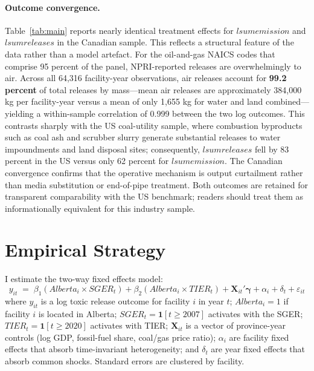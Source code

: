 \documentclass[12pt]{article}
\begin{document}
\paragraph{Outcome convergence.}
Table~\ref{tab:main} reports nearly identical treatment effects for
$\mathit{lsumemission}$ and $\mathit{lsumreleases}$ in the Canadian sample.
This reflects a structural feature of the data rather than a model artefact.
For the oil-and-gas NAICS codes that comprise 95 percent of the panel,
NPRI-reported releases are overwhelmingly to air.
Across all 64,316 facility-year observations, air releases account for
\textbf{99.2 percent} of total releases by mass---mean air releases are
approximately 384,000 kg per facility-year versus a mean of only 1,655 kg for
water and land combined---yielding a within-sample correlation of 0.999
between the two log outcomes.
This contrasts sharply with the US coal-utility sample, where combustion
byproducts such as coal ash and scrubber slurry generate substantial releases
to water impoundments and land disposal sites; consequently,
$\mathit{lsumreleases}$ fell by 83 percent in the US versus only 62 percent
for $\mathit{lsumemission}$.
The Canadian convergence confirms that the operative mechanism is output
curtailment rather than media substitution or end-of-pipe treatment.
Both outcomes are retained for transparent comparability with the
\citet{pham2024} US benchmark; readers should treat them as informationally
equivalent for this industry sample.

\section{Empirical Strategy}

I estimate the two-way fixed effects model:
\begin{equation}
  y_{it} \;=\;
    \beta_1\!\left(\mathit{Alberta}_i \times \mathit{SGER}_t\right)
    + \beta_2\!\left(\mathit{Alberta}_i \times \mathit{TIER}_t\right)
    + \mathbf{X}_{it}'\boldsymbol{\gamma}
    + \alpha_i
    + \delta_t
    + \varepsilon_{it}
  \label{eq:main}
\end{equation}
where $y_{it}$ is a log toxic release outcome for facility $i$ in year $t$;
$\mathit{Alberta}_i = 1$ if facility $i$ is located in Alberta;
$\mathit{SGER}_t = \mathbf{1}[t \geq 2007]$ activates with the SGER;
$\mathit{TIER}_t = \mathbf{1}[t \geq 2020]$ activates with TIER;
$\mathbf{X}_{it}$ is a vector of province-year controls (log GDP, fossil-fuel
share, coal/gas price ratio);
$\alpha_i$ are facility fixed effects that absorb time-invariant
heterogeneity; and $\delta_t$ are year fixed effects that absorb common
shocks.
Standard errors are clustered by facility.
\end{document}
